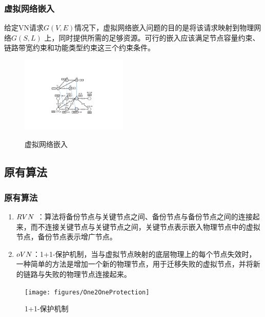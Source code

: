 \begin{frame}
\frametitle{虚拟网络嵌入}
给定VN请求$G (V,E)$情况下，虚拟网络嵌入问题的目的是将该请求映射到物理网络$G (S,L)$ 上，同时提供所需的足够资源。可行的嵌入应该满足节点容量约束、链路带宽约束和功能类型约束这三个约束条件。
\begin{figure}[htbp]
\centering
\includegraphics[width=2in]{figures/VirtualNetworkEmbedding}\\
\caption{虚拟网络嵌入}\label{fig:VirtualNetworkEmbedding}
\end{figure}
\end{frame}

%

\subsection{原有算法}
\begin{frame}
\frametitle{原有算法}
\begin{enumerate}
  \item $RVN$ ：算法将备份节点与关键节点之间、备份节点与备份节点之间的连接起来，而不连接关键节点与关键节点之间，关键节点表示嵌入物理节点中的虚拟节点，备份节点表示增广节点。
  \item $oVN$：1+1-保护机制，当与虚拟节点映射的底层物理上的每个节点失效时，一种简单的方法是增加一个新的物理节点，用于迁移失败的虚拟节点，并将新的链路与失败的物理节点连接起来。
\end{enumerate}
\end{frame}
\begin{frame}

\begin{figure}[htbp]
\centering
\texttt{[image: figures/One2OneProtection]}\\
\caption{1+1-保护机制}\label{fig:One2OneProtection}
\end{figure}
\end{frame}

